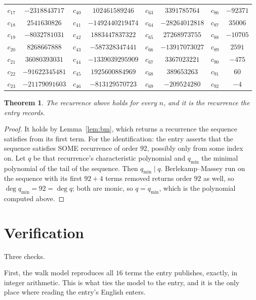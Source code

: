 \documentclass[11pt,a4paper]{article}
\theoremstyle{plain}
\newtheorem{theorem}{Theorem}
\theoremstyle{definition}
\begin{document}
\begin{center}
\begin{tabular}{cccccccc}
$c_{17}$ & $-2318843717$ & $c_{40}$ & $102461589246$ & $c_{63}$ & $3391785764$ & $c_{86}$ & $-92371$ \\
$c_{18}$ & $2541630826$ & $c_{41}$ & $-1492440219474$ & $c_{64}$ & $-28264012818$ & $c_{87}$ & $35006$ \\
$c_{19}$ & $-8032781031$ & $c_{42}$ & $1883447837322$ & $c_{65}$ & $27268973755$ & $c_{88}$ & $-10705$ \\
$c_{20}$ & $8268667888$ & $c_{43}$ & $-587328347441$ & $c_{66}$ & $-13917073027$ & $c_{89}$ & $2591$ \\
$c_{21}$ & $36080393031$ & $c_{44}$ & $-1339039295909$ & $c_{67}$ & $3367023221$ & $c_{90}$ & $-475$ \\
$c_{22}$ & $-91622345481$ & $c_{45}$ & $1925600884969$ & $c_{68}$ & $389653263$ & $c_{91}$ & $60$ \\
$c_{23}$ & $-21179091603$ & $c_{46}$ & $-813129570723$ & $c_{69}$ & $-209524280$ & $c_{92}$ & $-4$ \\
\end{tabular}
\end{center}

\begin{theorem}
The recurrence above holds for every $n$, and it is the recurrence the entry records.
\end{theorem}

\begin{proof}
It holds by Lemma~\ref{lem:bm}, which returns a recurrence the sequence satisfies from its
first term. For the identification: the entry asserts that the sequence satisfies SOME
recurrence of order $92$, possibly only from some index on. Let $q$ be that recurrence's
characteristic polynomial and $q_{\min}$ the minimal polynomial of the tail of the sequence.
Then $q_{\min}\mid q$. Berlekamp--Massey run on the sequence with its first $92+4$ terms
removed returns order $92$ as well, so $\deg q_{\min}=92=\deg q$; both are monic, so
$q=q_{\min}$, which is the polynomial computed above.
\end{proof}

\section{Verification}

Three checks.

First, the walk model reproduces all $16$ terms the entry publishes, exactly, in integer
arithmetic. This is what ties the model to the entry, and it is the only place where reading
the entry's English enters.
\end{document}

